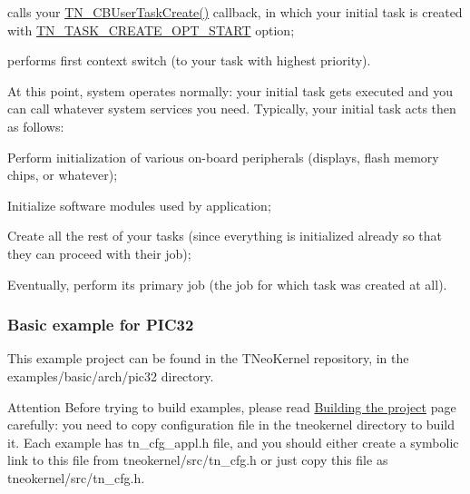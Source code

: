 \begin{DoxyItemize}
\begin{DoxyItemize}
\item calls your {\ttfamily \hyperlink{tn__sys_8h_a94f785ff88dfca8746f34de59784883d}{T\+N\+\_\+\+C\+B\+User\+Task\+Create()}} callback, in which your initial task is created with {\ttfamily \hyperlink{tn__tasks_8h_a8fa2ef577d6bd159b3fae559839f98d5a0c9352496e4465eb7e1b29dab7544acc}{T\+N\+\_\+\+T\+A\+S\+K\+\_\+\+C\+R\+E\+A\+T\+E\+\_\+\+O\+P\+T\+\_\+\+S\+T\+A\+R\+T}} option;
\item performs first context switch (to your task with highest priority).
\end{DoxyItemize}
\item At this point, system operates normally\+: your initial task gets executed and you can call whatever system services you need. Typically, your initial task acts then as follows\+:
\begin{DoxyItemize}
\item Perform initialization of various on-\/board peripherals (displays, flash memory chips, or whatever);
\item Initialize software modules used by application;
\item Create all the rest of your tasks (since everything is initialized already so that they can proceed with their job);
\item Eventually, perform its primary job (the job for which task was created at all).
\end{DoxyItemize}
\end{DoxyItemize}

\subsubsection*{Basic example for P\+I\+C32}

This example project can be found in the T\+Neo\+Kernel repository, in the {\ttfamily examples/basic/arch/pic32} directory.

\begin{DoxyAttention}{Attention}
Before trying to build examples, please read \hyperlink{building}{Building the project} page carefully\+: you need to copy configuration file in the tneokernel directory to build it. Each example has {\ttfamily tn\+\_\+cfg\+\_\+appl.\+h} file, and you should either create a symbolic link to this file from {\ttfamily tneokernel/src/tn\+\_\+cfg.\+h} or just copy this file as {\ttfamily tneokernel/src/tn\+\_\+cfg.\+h}.
\end{DoxyAttention}

